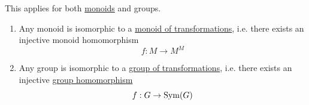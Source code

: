   \begin{theorem}
    \label{thm:cayleys-theorem}
    This applies for both \hyperref[def:monoid]{monoids} and groups. 
    \begin{enumerate}
      \item Any monoid is isomorphic to a \hyperref[def:monoid-of-transformations]{monoid of transformations}, i.e. there exists an injective monoid homomorphism 
        \begin{equation}
          f: M \to M^M
        \end{equation}
      \item Any group is isomorphic to a \hyperref[def:group-of-transformations]{group of transformations}, i.e. there exists an injective \hyperref[def:group-homomorphism]{group homomorphism}
        \begin{equation}
          f: G \to \operatorname{Sym}(G)
        \end{equation}
    \end{enumerate}
  \end{theorem}
